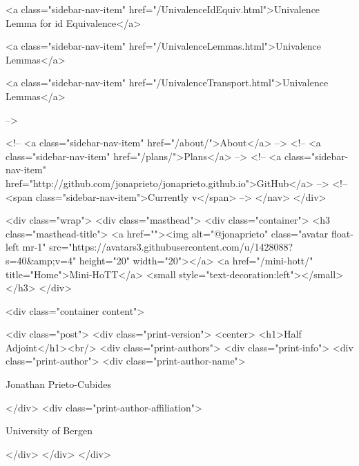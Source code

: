       
    
      
        
          <a class="sidebar-nav-item" href="/UnivalenceIdEquiv.html">Univalence Lemma for id Equivalence</a>
        
      
    
      
        
          <a class="sidebar-nav-item" href="/UnivalenceLemmas.html">Univalence Lemmas</a>
        
      
    
      
        
          <a class="sidebar-nav-item" href="/UnivalenceTransport.html">Univalence Lemmas</a>
        
      
     -->

    <!-- <a class="sidebar-nav-item" href="/about/">About</a> -->
    <!-- <a class="sidebar-nav-item" href="/plans/">Plans</a> -->
    <!-- <a class="sidebar-nav-item" href="http://github.com/jonaprieto/jonaprieto.github.io">GitHub</a> -->
    <!-- <span class="sidebar-nav-item">Currently v</span> -->
  </nav>
</div>

    <div class="wrap">
      <div class="masthead">
        <div class="container">
          <h3 class="masthead-title">
            <a href=""><img alt="@jonaprieto" class="avatar float-left mr-1" src="https://avatars3.githubusercontent.com/u/1428088?s=40&amp;v=4" height="20" width="20"></a>
            <a href="/mini-hott/" title="Home">Mini-HoTT</a>
            <small style="text-decoration:left"></small>
          </h3>
        </div>
      
      <div class="container content">
        







<div class="post">
  <div class="print-version">
    <center>
      <h1>Half Adjoint</h1><br/>
        <div class="print-authors">
          <div class="print-info">
            <div class="print-author">
              <div class="print-author-name">
                
                  Jonathan Prieto-Cubides
                
              </div>
              <div class="print-author-affiliation">
                
                  University of Bergen
                
                </div>
            </div>
          </div>
          
